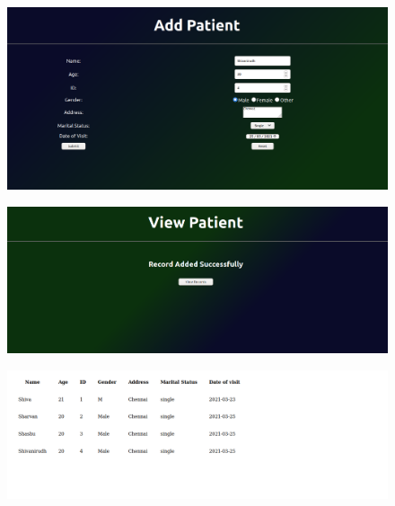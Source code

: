 \documentclass[12pt,letterpaper]{article}
\begin{document}
\subsubsection*{}
\begin{figure}[h]
    \centering
    \includegraphics[width = \textwidth]{Pics/add1.png}
\end{figure}
\begin{figure}[h!]
    \centering
    \includegraphics[width = \textwidth]{Pics/add2.png}
\end{figure}
\begin{figure}[h!]
    \centering
    \includegraphics[width = \textwidth]{Pics/add3.png}
\end{figure}
\newpage
\end{document}

